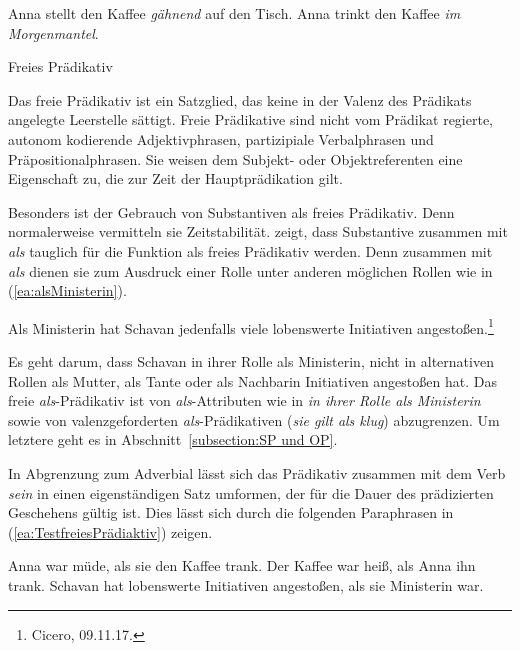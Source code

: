\ea \label{ea:frPrädForm}
\ea \label{ea:frPPart} Anna stellt den Kaffee \textit{gähnend} auf den Tisch. 
\ex \label{ex:frPPP} Anna trinkt den Kaffee \textit{im Morgenmantel}.
\z 
\z 

\newpage
\begin{Definition}{Freies Prädikativ}
    
\noindent Das freie Prädikativ ist ein Satzglied, das keine in der Valenz des Prädikats angelegte Leerstelle sättigt. Freie Prädikative sind nicht vom Prädikat regierte, autonom kodierende Adjektivphrasen, partizipiale Verbalphrasen und Präpositionalphrasen. Sie weisen dem Subjekt- oder Objektreferenten eine Eigenschaft zu, die zur Zeit der Hauptprädikation gilt. 
\end{Definition}


Besonders ist der Gebrauch von Substantiven als freies Prädikativ. Denn normalerweise vermitteln sie Zeitstabilität. \citet[565--566]{Agel2017} zeigt, dass Substantive zusammen mit \textit{als} tauglich für die Funktion als freies Prädikativ werden. Denn zusammen mit \textit{als} dienen sie zum Ausdruck einer Rolle unter anderen möglichen Rollen wie in (\ref{ea:alsMinisterin}).

\ea \label{ea:alsMinisterin} Als Ministerin hat Schavan jedenfalls viele lobenswerte Initiativen angestoßen.\footnote{Cicero, 09.11.17.}
\z 

Es geht darum, dass Schavan in ihrer Rolle als Ministerin, nicht in alternativen Rollen als Mutter, als Tante oder als Nachbarin Initiativen angestoßen hat. Das freie \textit{als}-Prädikativ ist von \textit{als}-Attributen wie in \textit{in ihrer Rolle als Ministerin} sowie von valenzgeforderten \textit{als}-Prädikativen (\textit{sie gilt als klug}) abzugrenzen. Um letztere geht es in Abschnitt~\ref{subsection:SP und OP}. 

In Abgrenzung zum Adverbial lässt sich das Prädikativ zusammen mit dem Verb \textit{sein} in einen eigenständigen Satz umformen, der für die Dauer des prädizierten Geschehens gültig ist. Dies lässt sich durch die folgenden Paraphrasen in (\ref{ea:TestfreiesPrädiaktiv}) zeigen.

\ea \label{ea:TestfreiesPrädiaktiv}
\ea \label{ea:Subj_zu_diesem_Zeitpunkt_sein} Anna war müde, als sie den Kaffee trank. 
\ex \label{ex:Obj_zu_diesem_Zeitpunkt_sein} Der Kaffee war heiß, als Anna ihn trank.
\ex \label{ex:alsX_zu_diesem_Zeitpunkt_sein} Schavan hat lobenswerte Initiativen angestoßen, als sie Ministerin war.
\z 
\z

